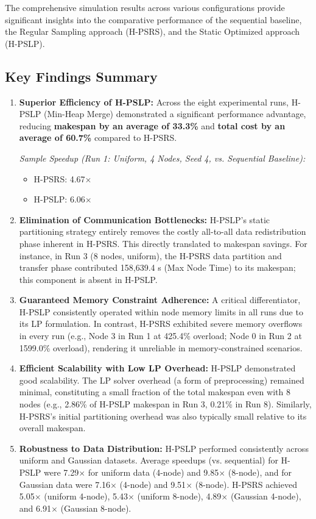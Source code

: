\documentclass[]{interact}
\theoremstyle{plain}
\theoremstyle{definition}
\theoremstyle{remark}
\begin{document}
The comprehensive simulation results across various configurations provide significant insights into the comparative performance of the sequential baseline, the Regular Sampling approach (H-PSRS), and the Static Optimized approach (H-PSLP).

\subsection{Key Findings Summary}
\begin{enumerate}
    \item \textbf{Superior Efficiency of H-PSLP:} Across the eight experimental runs, H-PSLP (Min-Heap Merge) demonstrated a significant performance advantage, reducing \textbf{makespan by an average of 33.3\%} and \textbf{total cost by an average of 60.7\%} compared to H-PSRS.
    
    \textit{Sample Speedup (Run 1: Uniform, 4 Nodes, Seed 4, vs. Sequential Baseline):}
    \begin{itemize}
        \item H-PSRS: 4.67$\times$
        \item H-PSLP: 6.06$\times$
    \end{itemize}

    \item \textbf{Elimination of Communication Bottlenecks:} H-PSLP’s static partitioning strategy entirely removes the costly all-to-all data redistribution phase inherent in H-PSRS. This directly translated to makespan savings. For instance, in Run 3 (8 nodes, uniform), the H-PSRS data partition and transfer phase contributed 158,639.4 \textmu{}s (Max Node Time) to its makespan; this component is absent in H-PSLP.

    \item \textbf{Guaranteed Memory Constraint Adherence:} A critical differentiator, H-PSLP consistently operated within node memory limits in all runs due to its LP formulation. In contrast, H-PSRS exhibited severe memory overflows in every run (e.g., Node 3 in Run 1 at 425.4\% overload; Node 0 in Run 2 at 1599.0\% overload), rendering it unreliable in memory-constrained scenarios.

    \item \textbf{Efficient Scalability with Low LP Overhead:} H-PSLP demonstrated good scalability. The LP solver overhead (a form of preprocessing) remained minimal, constituting a small fraction of the total makespan even with 8 nodes (e.g., 2.86\% of H-PSLP makespan in Run 3, 0.21\% in Run 8). Similarly, H-PSRS's initial partitioning overhead was also typically small relative to its overall makespan.

    \item \textbf{Robustness to Data Distribution:} H-PSLP performed consistently across uniform and Gaussian datasets. Average speedups (vs. sequential) for H-PSLP were 7.29$\times$ for uniform data (4-node) and 9.85$\times$ (8-node), and for Gaussian data were 7.16$\times$ (4-node) and 9.51$\times$ (8-node). H-PSRS achieved 5.05$\times$ (uniform 4-node), 5.43$\times$ (uniform 8-node), 4.89$\times$ (Gaussian 4-node), and 6.91$\times$ (Gaussian 8-node).
\end{enumerate}
\end{document}
